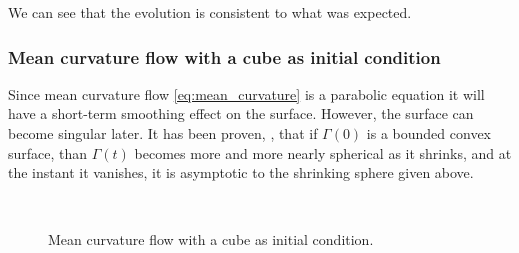 \documentclass[a4paper,11pt, onecolumn]{article}
\begin{document}
We can see that the evolution is consistent to what was expected.

\subsubsection{Mean curvature flow with a cube as initial condition}

Since mean curvature flow \eqref{eq:mean_curvature} is a parabolic equation it
will have a short-term smoothing effect on the surface. However, the surface can
become singular later. It has been proven, \cite{Huisken84}, that if $\Gamma(0)$
is a bounded convex surface, than $\Gamma(t)$ becomes more and more nearly
spherical as it shrinks, and at the instant it vanishes, it is asymptotic to the
shrinking sphere given above.
\newline

\begin{figure}[htbp]
 \centering
 \quad
 \\
 \quad
 \caption{Mean curvature flow with a cube as initial condition.}
 \label{fig:mcf_cube}
\end{figure}
\end{document}
